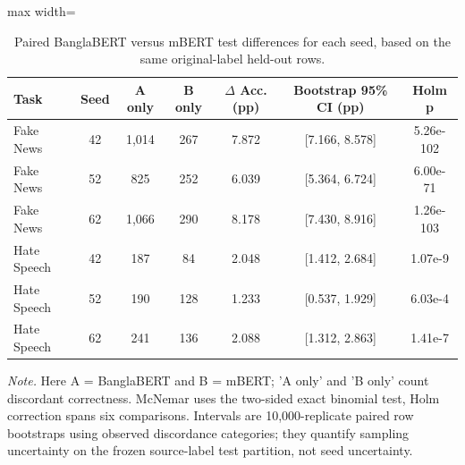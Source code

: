 \begin{table}[t]
\centering
\caption{Paired BanglaBERT versus mBERT test differences for each seed, based on the same original-label held-out rows.}
\label{tab:sig}
\footnotesize
\begin{adjustbox}{max width=\linewidth}
\begin{tabular}{lcccccc}
\toprule
Task & Seed & A only & B only & $\Delta$ Acc. (pp) & Bootstrap 95\% CI (pp) & Holm p \\
\midrule
Fake News & 42 & 1,014 & 267 & 7.872 & [7.166, 8.578] & 5.26e-102 \\
Fake News & 52 & 825 & 252 & 6.039 & [5.364, 6.724] & 6.00e-71 \\
Fake News & 62 & 1,066 & 290 & 8.178 & [7.430, 8.916] & 1.26e-103 \\
Hate Speech & 42 & 187 & 84 & 2.048 & [1.412, 2.684] & 1.07e-9 \\
Hate Speech & 52 & 190 & 128 & 1.233 & [0.537, 1.929] & 6.03e-4 \\
Hate Speech & 62 & 241 & 136 & 2.088 & [1.312, 2.863] & 1.41e-7 \\
\bottomrule
\end{tabular}
\end{adjustbox}
\par\vspace{2pt}
\begin{minipage}{\linewidth}
\scriptsize\emph{Note.} Here A = BanglaBERT and B = mBERT; 'A only' and 'B only' count discordant correctness. McNemar uses the two-sided exact binomial test, Holm correction spans six comparisons. Intervals are 10,000-replicate paired row bootstraps using observed discordance categories; they quantify sampling uncertainty on the frozen source-label test partition, not seed uncertainty.
\end{minipage}
\end{table}

